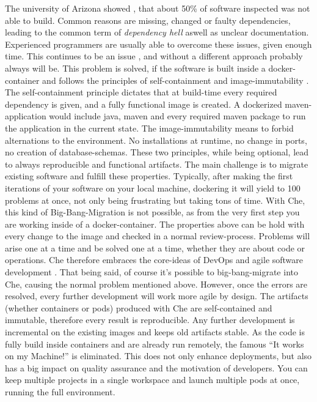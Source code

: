 \documentclass[utf8]{lni}
\begin{document}
The university of Arizona showed \cite{CO16}, that about 50\% of software inspected was not able to build. 
Common reasons are missing, changed or faulty dependencies, leading to the common term of \textit{dependency hell} aswell as unclear documentation. 
Experienced programmers are usually able to overcome these issues, given enough time. This continues to be an issue \cite{CL14}, and without a different approach probably always will be. 
This problem is solved, if the software is built inside a docker-container and follows the principles of self-containment and image-immutability \cite{BI17}.
The self-containment principle dictates that  at build-time every required dependency is given, and a fully functional image is created.
A dockerized maven-application would include java, maven and every required maven package to run the application in the current state. 
The image-immutability means to forbid alternations to the environment. 
No installations at runtime, no change in ports, no creation of database-schemas.
These two principles, while being optional, lead to always reproducible and functional artifacts.
The main challenge is to migrate existing software and fulfill these properties. 
Typically, after making the first iterations of your software on your local machine, dockering it will yield to 100 problems at once, not only being frustrating but taking tons of time. 
With Che, this kind of Big-Bang-Migration is not possible, as from the very first step you are working inside of a docker-container.
The properties above can be hold with every change to the image and checked in a normal review-process. 
Problems will arise one at a time and be solved one at a time, whether they are about code or operations. 
Che therefore embraces the core-ideas of DevOps \cite{HUE12}\cite{JA16} and agile software development \cite{EBE16}.
That being said, of course it's possible to big-bang-migrate into Che, causing the normal problem mentioned above. 
However, once the errors are resolved, every further development will work more agile by design.
The artifacts (whether containers or pods) produced with Che are self-contained and immutable, therefore every result is reproducible. 
Any further development is incremental on the existing images and keeps old artifacts stable. 
As the code is fully build inside containers and are already run remotely, the famous “It works on my Machine!” is eliminated. 
This does not only enhance deployments, but also has a big impact on quality assurance and the motivation of developers. 
You can keep multiple projects in a single workspace and launch multiple pods at once, running the full environment. 
\end{document}
